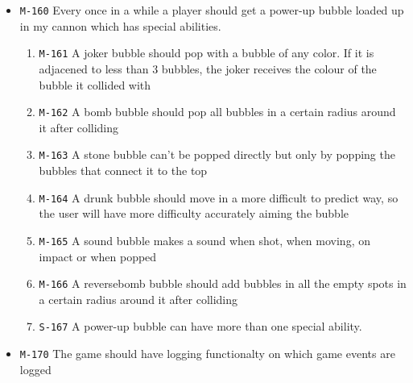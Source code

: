\documentclass[a4paper]{article}
\begin{document}
\begin{itemize}
  
  \item \texttt{M-160} Every once in a while a player should get a power-up bubble loaded up in my cannon which has special abilities.
  
          \begin{enumerate}
          \item \texttt{M-161} A joker bubble should pop with a bubble of any color. If it is adjacened to less than 3 bubbles, the joker receives the colour of the bubble it collided with
          \item \texttt{M-162} A bomb bubble should pop all bubbles in a certain radius around it after colliding
          \item \texttt{M-163} A stone bubble can't be popped directly but only by popping the bubbles that connect it to the top
          \item \texttt{M-164} A drunk bubble should move in a more difficult to predict way, so the user will have more difficulty accurately aiming the bubble
		 
          \item \texttt{M-165} A sound bubble makes a sound when shot, when moving, on impact or when popped
          \item \texttt{M-166} A reversebomb bubble should add bubbles in all the empty spots in a certain radius around it after colliding
          \item \texttt{S-167} A power-up bubble can have more than one special ability.
      \end{enumerate}
 
  
  
  
  \item \texttt{M-170} The game should have logging functionalty on which game events are logged
  

\end{itemize}
\end{document}

